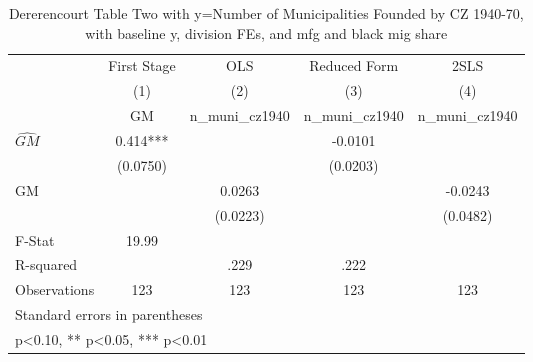 \begin{table}[htbp]\centering
\def\sym#1{\ifmmode^{#1}\else\(^{#1}\)\fi}
\caption{Dererencourt Table Two with y=Number of Municipalities Founded by CZ 1940-70, with baseline y, division FEs, and mfg and black mig share}
\begin{tabular}{l*{4}{c}}
\toprule
                    & First Stage   &         OLS   &Reduced Form   &        2SLS   \\
                    &\multicolumn{1}{c}{(1)}&\multicolumn{1}{c}{(2)}&\multicolumn{1}{c}{(3)}&\multicolumn{1}{c}{(4)}\\
                    &\multicolumn{1}{c}{GM}&\multicolumn{1}{c}{n\_muni\_cz1940}&\multicolumn{1}{c}{n\_muni\_cz1940}&\multicolumn{1}{c}{n\_muni\_cz1940}\\
\midrule
$\hat{GM}$          &       0.414***&               &     -0.0101   &               \\
                    &    (0.0750)   &               &    (0.0203)   &               \\
\addlinespace
GM                  &               &      0.0263   &               &     -0.0243   \\
                    &               &    (0.0223)   &               &    (0.0482)   \\
\midrule
F-Stat              &       19.99   &               &               &               \\
R-squared           &               &        .229   &        .222   &               \\
Observations        &         123   &         123   &         123   &         123   \\
\bottomrule
\multicolumn{5}{l}{\footnotesize Standard errors in parentheses}\\
\multicolumn{5}{l}{\footnotesize * p<0.10, ** p<0.05, *** p<0.01}\\
\end{tabular}
\end{table}

